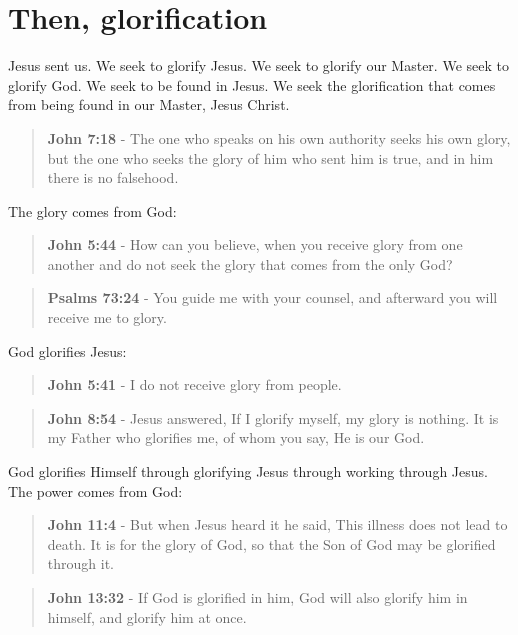 \documentclass[11pt]{article}
\begin{document}
\section{Then, glorification}
\label{sec:orgd0a593f}
Jesus sent us. We seek to glorify Jesus. We seek to glorify our Master.
We seek to glorify God. We seek to be found in Jesus. We seek the glorification that comes from being found in our Master, Jesus Christ.

\begin{quote}
\textbf{John 7:18} - The one who speaks on his own authority seeks his own glory, but the one who seeks the glory of him who sent him is true, and in him there is no falsehood.
\end{quote}

The glory comes from God:

\begin{quote}
\textbf{John 5:44} - How can you believe, when you receive glory from one another and do not seek the glory that comes from the only God?
\end{quote}

\begin{quote}
\textbf{Psalms 73:24} - You guide me with your counsel, and afterward you will receive me to glory.
\end{quote}

God glorifies Jesus:

\begin{quote}
\textbf{John 5:41} - I do not receive glory from people.
\end{quote}

\begin{quote}
\textbf{John 8:54} - Jesus answered, If I glorify myself, my glory is nothing. It is my Father who glorifies me, of whom you say, He is our God.
\end{quote}

God glorifies Himself through glorifying Jesus through working through Jesus. The power comes from God:

\begin{quote}
\textbf{John 11:4} - But when Jesus heard it he said, This illness does not lead to death. It is for the glory of God, so that the Son of God may be glorified through it.
\end{quote}

\begin{quote}
\textbf{John 13:32} - If God is glorified in him, God will also glorify him in himself, and glorify him at once.
\end{quote}
\end{document}

